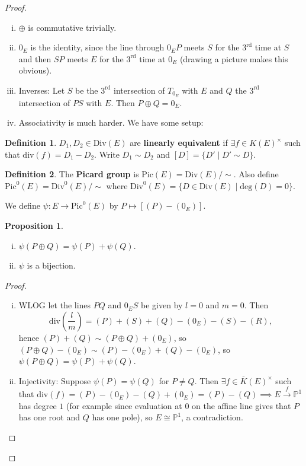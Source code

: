 \documentclass{article}
\theoremstyle{definition}
\newtheorem{prop}[theorem]{Proposition}
\newtheorem{defn}{Definition}[section]
\begin{document}
\begin{proof}
    \begin{enumerate}[(i)]
        \item $\oplus$ is commutative trivially.
        \item $0_E$ is the identity, since the line through $0_EP$ meets $S$ for the $3^{\text{rd}}$ time at $S$ and then $SP$ meets $E$ for the $3^{\text{rd}}$ time at $0_E$ (drawing a picture makes this obvious).
        \item Inverses: Let $S$ be the $3^{\text{rd}}$ intersection of $T_{0_E}$ with $E$ and $Q$ the $3^{\text{rd}}$ intersection of $PS$ with $E$. Then $P \oplus Q = 0_E$.
        \item Associativity is much harder. We have some setup:
    \end{enumerate}
    \begin{defn}
        $D_1,D_2 \in \text{Div}(E)$ are \textbf{linearly equivalent} if $\exists f \in K(E)^\times$ such that $\text{div}(f) = D_1 - D_2$. Write $D_1 \sim D_2$ and $[D] = \{D' \mid D' \sim D\}$.
    \end{defn}
    \begin{defn}
        The \textbf{Picard group} is $\text{Pic}(E) = \text{Div}(E)/\sim$. Also define $\text{Pic}^0(E) = \text{Div}^0(E)/\sim$ where $\text{Div}^0(E) = \{D \in \text{Div}(E) \mid \text{deg}(D) = 0\}$.
    \end{defn}
    We define $\psi: E \to \text{Pic}^0(E)$ by $P \mapsto [(P)-(0_E)]$.
    \begin{prop}
        \begin{enumerate}[(i)]
            \item $\psi(P \oplus Q) = \psi(P) + \psi(Q)$.
            \item $\psi$ is a bijection.
        \end{enumerate}
    \end{prop}
    \begin{proof}
        \begin{enumerate}[(i)]
            \item WLOG let the lines $PQ$ and $0_ES$ be given by $l=0$ and $m=0$. Then \[
            \text{div}\left(\frac{l}{m}\right) = (P)+(S)+(Q)-(0_E)-(S)-(R),
            \]
            hence $(P)+(Q) \sim (P \oplus Q) + (0_E)$, so $(P\oplus Q)- (0_E) \sim (P)-(0_E) + (Q) - (0_E)$, so $\psi(P \oplus Q) = \psi(P) + \psi(Q)$.
            \item Injectivity: Suppose $\psi(P) = \psi(Q)$ for $P \neq Q$. Then $\exists f \in \overline{K}(E)^\times$ such that $\text{div}(f) = (P)-(0_E)-(Q)+(0_E) = (P) - (Q) \implies E \stackrel{f}{\to} \mathbb{P}^1$ has degree $1$ (for example since evaluation at 0 on the affine line gives that $P$ has one root and $Q$ has one pole), so $E \cong \mathbb{P}^1$, a contradiction.
            \vspace{1mm}
             

\end{enumerate}
\end{proof}
\end{proof}
\end{document}
